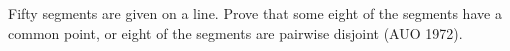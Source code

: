 Fifty segments are given on a line. Prove that some eight of the segments have a common point, or eight of the segments are pairwise disjoint (AUO 1972).
